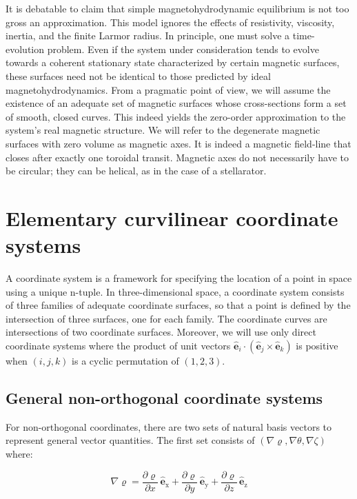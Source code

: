 \quad It is debatable to claim that simple magnetohydrodynamic equilibrium is not too gross an approximation. This model ignores the effects of resistivity, viscosity, inertia, and the finite Larmor radius. In principle, one must solve a time-evolution problem. Even if the system under consideration tends to evolve towards a coherent stationary state characterized by certain magnetic surfaces, these surfaces need not be identical to those predicted by ideal magnetohydrodynamics. From a pragmatic point of view, we will assume the existence of an adequate set of magnetic surfaces whose cross-sections form a set of smooth, closed curves. This indeed yields the zero-order approximation to the system's real magnetic structure. We will refer to the degenerate magnetic surfaces with zero volume as magnetic axes. It is indeed a magnetic field-line that closes after exactly one toroidal transit. Magnetic axes do not necessarily have to be circular; they can be helical, as in the case of a stellarator.

\section{Elementary curvilinear coordinate systems}

A coordinate system is a framework for specifying the location of a point in space using a unique n-tuple. In three-dimensional space, a coordinate system consists of three families of adequate coordinate surfaces, so that a point is defined by the intersection of three surfaces, one for each family. The coordinate curves are intersections of two coordinate surfaces. Moreover, we will use only direct coordinate systems where the product of unit vectors $\mathbf{\hat{e}}_i\cdot(\mathbf{\hat{e}}_j\times\mathbf{\hat{e}}_k)$ is positive when $(i, j, k)$ is a cyclic permutation of $(1,2,3)$.

\subsection{General non-orthogonal coordinate systems}

For non-orthogonal coordinates, there are two sets of natural basis vectors to represent general vector quantities. The first set consists of $(\nabla\varrho,\nabla\theta,\nabla\zeta)$ where:

\begin{equation}
    \nabla\varrho=\frac{\partial\varrho}{\partial x}\,\mathbf{\hat{e}}_\text{x}+\frac{\partial\varrho}{\partial y}\,\mathbf{\hat{e}}_\text{y}+\frac{\partial\varrho}{\partial z}\,\mathbf{\hat{e}}_\text{z}
\end{equation}

